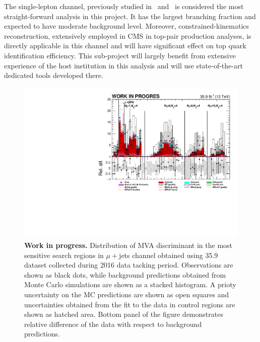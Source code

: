 \textcolor{\mycolor}{The single-lepton channel, previously studied in~\cite{CMS:2016wig,Beck:2016hyi} and~\cite{Khachatryan:2014sca} is considered the most straight-forward analysis in this project. It has the largest branching fraction and expected to have moderate background level. Moreover, constrained-kinematics reconstruction, extensively employed in CMS in top-pair production analyses, is directly applicable in this channel and will have significant effect on top quark identification efficiency. This sub-project will largely benefit from extensive experience of the host institution in this analysis and will use state-of-the-art dedicated tools developed there.} \begin{figure}
\centering
\includegraphics[width=\linewidth]{figures/mu}
\caption{\textbf{Work in progress.} Distribution of MVA discriminant in the most sensitive search regions in $\mu+$jets channel obtained using 35.9 \invfb dataset collected during 2016 data tacking period. Observations are shown as black dots, while background predictions obtained from Monte Carlo simulations are shown as a stacked histogram. A prioty uncertainty on the MC predictions are shown as open squares and uncertainties obtained from the fit to the data in control regions are shown as hatched area. Bottom panel of the figure demonstrates relative difference of the data with respect to background predictions.}
\label{fig:mu}
\end{figure}
